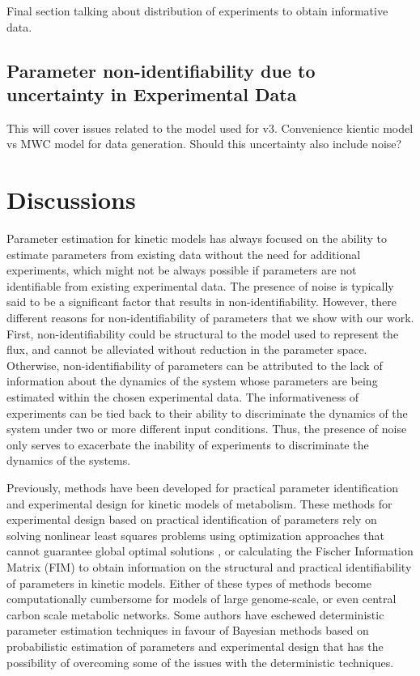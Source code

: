 \documentclass[10pt]{article}
\begin{document}
	
	Final section talking about distribution of experiments to obtain informative data.
	
	
	
	
	
	
	\subsection{Parameter non-identifiability due to uncertainty in Experimental Data}\label{sec:uncertainty}
	
	
	This will cover issues related to the model used for v3. Convenience kientic model vs MWC model for data generation. Should this uncertainty also include noise?			
	
	
	
	\section{Discussions}\label{sec:discussion}	
	Parameter estimation for kinetic models has always focused on the ability to estimate parameters from existing data without the need for additional experiments, which might not be always possible if parameters are not identifiable from existing experimental data. The presence of noise is typically said to be a significant factor that results in non-identifiability. However, there different reasons for non-identifiability of parameters that we show with our work. First, non-identifiability could be structural to the model used to represent the flux, and cannot be alleviated without reduction in the parameter space. Otherwise, non-identifiability of parameters can be attributed to the lack of information about the dynamics of the system whose parameters are being estimated within the chosen experimental data. The informativeness of experiments can be tied back to their ability to discriminate the dynamics of the system under two or more different input conditions. Thus, the presence of noise only serves to exacerbate the inability of experiments to discriminate the dynamics of the systems. 
	
	Previously, methods have been developed for practical parameter identification and experimental design for kinetic models of metabolism. These methods for experimental design based on practical identification of parameters rely on solving nonlinear least squares problems using optimization approaches that cannot guarantee global optimal solutions \parencite{Raue2009a}, or calculating the Fischer Information Matrix (FIM) to obtain information on the structural and practical identifiability of parameters in kinetic models. Either of these types of methods become computationally cumbersome for models of large genome-scale, or even central carbon scale metabolic networks. Some authors have eschewed deterministic parameter estimation techniques in favour of Bayesian methods based on probabilistic estimation of parameters and experimental design \parencite{Saa2016, Saa2016a} that has the possibility of overcoming some of the issues with the deterministic techniques. 	
	 
\end{document}
